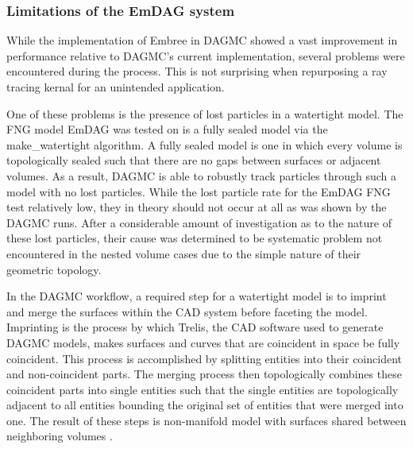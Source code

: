 \documentclass[12pt, a4paper]{article}
\begin{document}
\subsubsection{Limitations of the EmDAG system}%

While the implementation of Embree in DAGMC showed a vast improvement in performance relative to DAGMC's current implementation, several problems were encountered during the process. This is not surprising when repurposing a ray tracing kernal for an unintended application.

One of these problems is the presence of lost particles in a watertight model. The FNG model EmDAG was tested on is a fully sealed model via the make\_watertight algorithm. A fully sealed model is one in which every volume is topologically sealed such that there are no gaps between surfaces or adjacent volumes. As a result, DAGMC is able to robustly track particles through such a model with no lost particles. While the lost particle rate for the EmDAG FNG test relatively low, they in theory should not occur at all as was shown by the DAGMC runs. After a considerable amount of investigation as to the nature of these lost particles, their cause was determined to be systematic problem not encountered in the nested volume cases due to the simple nature of their geometric topology.

In the DAGMC workflow, a required step for a watertight model is to imprint and merge the surfaces within the CAD system before faceting the model. Imprinting is the process by which Trelis, the CAD software used to generate DAGMC models, makes surfaces and curves that are coincident in space be fully coincident. This process is accomplished by splitting entities into their coincident and non-coincident parts. The merging process then topologically combines these coincident parts into single entities such that the single entities are topologically adjacent to all entities bounding the original set of entities that were merged into one. The result of these steps is non-manifold model with surfaces shared between neighboring volumes \cite{Smith_2011}.
\end{document}
